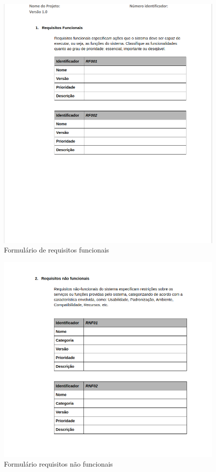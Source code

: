 \documentclass[	DIV=calc,%
							paper=a4,%
							fontsize=12pt,%
							onecolumn]{scrartcl}	 					%
\begin{document}
\begin{figure}
	\centering
	\includegraphics[width=\textwidth]{requisitos1}
	\caption{Formulário de requisitos funcionais}
	\label{Figura 1}
\end{figure}

\begin{figure}
	\centering
	\includegraphics[width=\textwidth]{requisitos2}
	\caption{Formulário requisitos não funcionais}
	\label{Figura 2}
\end{figure}
\end{document}
